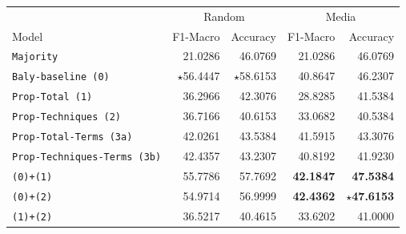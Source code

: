 \begin{table}[!htbp]
    \centering
    \scriptsize
    \begin{tabular}{l|rr|rr}
                                            & \multicolumn{2}{c}{Random} & \multicolumn{2}{c}{Media}                                                     \\
        Model                               & F1-Macro                   & Accuracy                  & F1-Macro                & Accuracy                \\
        \hline
        \texttt{Majority}                   & 21.0286                    & 46.0769                   & 21.0286                 & 46.0769                 \\
        \texttt{Baly-baseline (0)}          & $\star$56.4447             & $\star$58.6153            & 40.8647                 & 46.2307                 \\
        \hline
        \texttt{Prop-Total (1)}             & 36.2966                    & 42.3076                   & 28.8285                 & 41.5384                 \\
        \texttt{Prop-Techniques (2)}        & 36.7166                    & 40.6153                   & 33.0682                 & 40.5384                 \\
        \texttt{Prop-Total-Terms (3a)}      & 42.0261                    & 43.5384                   & 41.5915                 & 43.3076                 \\
        \texttt{Prop-Techniques-Terms (3b)} & 42.4357                    & 43.2307                   & 40.8192                 & 41.9230                 \\
        \hline
        \texttt{(0)+(1)}                    & 55.7786                    & 57.7692                   & \textbf{42.1847}        & \textbf{47.5384}        \\
        \texttt{(0)+(2)}                    & 54.9714                    & 56.9999                   & \textbf{42.4362}        & \textbf{$\star$47.6153} \\
        \texttt{(1)+(2)}                    & 36.5217                    & 40.4615                   & 33.6202                 & 41.0000                 \\

\end{tabular}
\end{table}
